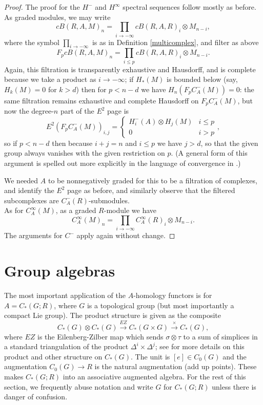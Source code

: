 \documentclass{memo-l}
\theoremstyle{definition}
\theoremstyle{remark}
\numberwithin{section}{chapter}
\numberwithin{equation}{chapter}
\begin{document}
\begin{proof}
The proof for the $H^-$ and $H^\infty$ spectral sequences follow mostly as before. As graded modules, we may write $$cB(R,A, M)_n = \prod_{i \to -\infty} cB(R,A, R)_i \otimes M_{n-i},$$ where the symbol $\prod_{i \to -\infty}$ is as in Definition \ref{multicomplex}, and filter as above $$F_p cB(R,A,M)_n = \prod_{i \leq p} cB(R,A,R)_i \otimes M_{n-i}.$$ Again, this filtration is transparently exhaustive and Hausdorff, and is complete because we take a product as $i \to -\infty$; if $H_*(M)$ is bounded below (say, $H_k(M) = 0$ for $k > d$) then  for $p < n - d$ we have $H_n(F_p C^-_A(M)) = 0$: the same filtration remains exhaustive and complete Hausdorff on $F_p C^-_A(M)$, but now the degree-$n$ part of the $E^2$ page is $$E^2(F_p C^-_A(M))_{i,j} = \begin{cases} H_i^-(A) \otimes H_j(M) & i \le p \\ 0 & i > p \end{cases},$$ so if $p < n - d$ then because $i + j = n$ and $i \le p$ we have $j > d$, so that the given group always vanishes with the given restriction on $p$. (A general form of this argument is spelled out more explicitly in the language of convergence in \cite[Theorem 5.5.10(2)]{weibel1995introduction}.)

We needed $A$ to be nonnegatively graded for this to be a filtration of complexes, and identify the $E^2$ page as before, and similarly observe that the filtered subcomplexes are $C^-_A(R)$-submodules.\\

As for $C^\infty_A(M)$, as a graded $R$-module we have $$C^\infty_A(M)_n = \prod_{i \to -\infty} C^\infty_A(R)_i  \otimes M_{n-i}.$$ The arguments for $C^-$ apply again without change.
\end{proof}

\section{Group algebras}\label{sec:gpalg}
The most important application of the $A$-homology functors is for $A = C_*(G;R)$, where $G$ is a topological group (but most importantly a compact Lie group). The product structure is given as the composite $$C_*(G) \otimes C_*(G) \xrightarrow{EZ} C_*(G \times G) \xrightarrow{\times} C_*(G),$$ where $EZ$ is the Eilenberg-Zilber map which sends $\sigma \otimes \tau$ to a sum of simplices in a standard triangulation of the product $\Delta^i \times \Delta^j$; see \cite[Section 26(b)]{FHT} for more details on this product and other structure on $C_*(G)$. The unit is $[e] \in C_0(G)$ and the augmentation $C_0(G) \to R$ is the natural augmentation (add up points). These makes $C_*(G;R)$ into an associative augmented algebra. For the rest of this section, we frequently abuse notation and write $G$ for $C_*(G;R)$ unless there is danger of confusion.
\end{document}
